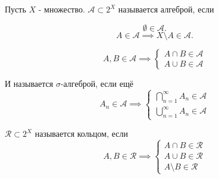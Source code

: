 \def\questionsurl{https://github.com/gt22/hse-questions-calculus/blob/pdf/term2-calculus-questions.pdf}

\begin{definition} \thmslashn 

    Пусть $X$ - множество. $\mathcal{A} \subset 2^{X}$ называется алгеброй, если
    
    \[ \emptyset\in \mathcal{A} .\] 
    \[ A\in \mathcal{A} \implies X \setminus A\in \mathcal{A} .\] 

    \begin{equation*}
        A, B\in \mathcal{A} \implies
        \begin{cases}
            A\cap B\in \mathcal{A}\\
            A \cup B\in \mathcal{A}
        \end{cases}
    \end{equation*}

    И называется $\sigma$-алгеброй, если ещё
    \begin{equation*}
        A_{n}\in \mathcal{A} \implies
        \begin{cases}
            \bigcap\limits_{n=1}^{\infty} A_{n}\in \mathcal{A}\\
            \bigcup\limits_{n=1}^{\infty} A_{n}\in \mathcal{A}
        \end{cases}
    \end{equation*}
\end{definition}
\begin{definition}[Кольцо] \thmslashn 

    $\mathcal{R} \subset 2^{X}$ называется кольцом, если
    \begin{equation*}
        A, B\in \mathcal{R} \implies
        \begin{cases}
            A\cap B\in \mathcal{R}\\
            A \cup B\in \mathcal{R}\\
            A \setminus B\in \mathcal{R}
        \end{cases}
    \end{equation*}
\end{definition}
